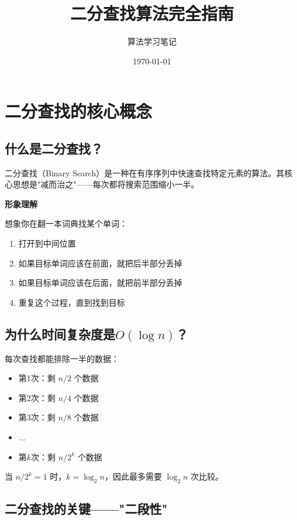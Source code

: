 \documentclass[12pt,a4paper]{article}
\title{\Huge \textbf{二分查找算法完全指南}}
\author{算法学习笔记}
\date{\today}
\begin{document}
	
	\maketitle
	
	\tableofcontents
	\newpage
	
	\section{二分查找的核心概念}
	
	\subsection{什么是二分查找？}
	
	二分查找（Binary Search）是一种在有序序列中快速查找特定元素的算法。其核心思想是"减而治之"——每次都将搜索范围缩小一半。
	
	\begin{bluebox}
		\textbf{形象理解}
		
		想象你在翻一本词典找某个单词：
		\begin{enumerate}
			\item 打开到中间位置
			\item 如果目标单词应该在前面，就把后半部分丢掉
			\item 如果目标单词应该在后面，就把前半部分丢掉
			\item 重复这个过程，直到找到目标
		\end{enumerate}
	\end{bluebox}
	
	\subsection{为什么时间复杂度是$O(\log n)$？}
	
	每次查找都能排除一半的数据：
	\begin{itemize}
		\item 第1次：剩 $n/2$ 个数据
		\item 第2次：剩 $n/4$ 个数据
		\item 第3次：剩 $n/8$ 个数据
		\item ...
		\item 第$k$次：剩 $n/2^k$ 个数据
	\end{itemize}
	
	当 $n/2^k = 1$ 时，$k = \log_2 n$，因此最多需要 $\log_2 n$ 次比较。
	
	\subsection{二分查找的关键——"二段性"}
	
\end{document}
